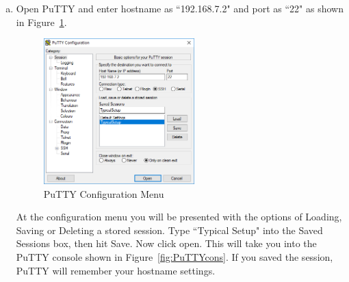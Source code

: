 \begin{enumerate}[a)]
    \item Open PuTTY and enter hostname as ``192.168.7.2" and port as ``22" as shown in Figure~\ref{fig:PuTTYLog}. %
    \begin{figure}
        \centering
        \includegraphics[width= 0.55\textwidth]{figs/img/Lab0/PuTTY.png}
        \caption{PuTTY Configuration Menu}
        \label{fig:PuTTYLog}
    \end{figure}    
    At the configuration menu you will be presented with the options of Loading, Saving or Deleting a stored session. 
    Type ``Typical Setup" into the Saved Sessions box, then hit Save. Now click open. This will take you into the PuTTY console shown in Figure~\ref{fig:PuTTYcons}. If you saved the session, PuTTY will remember your hostname settings.
    

\end{enumerate}
